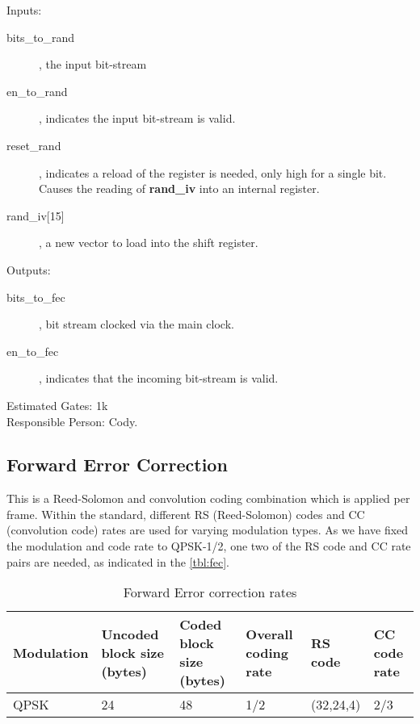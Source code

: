 \documentclass[dvips,10pt,twocolumn]{article}
\begin{document}
	\begin{description}
		\item{Inputs:}
		\begin{description}
			\item[bits\_to\_rand], the input bit-stream
			\item[en\_to\_rand], indicates the input bit-stream
				is valid.
			\item[reset\_rand], indicates a reload of the
				register is needed, only high for a single
				bit. Causes the reading of \textbf{rand\_iv}
				into an internal register.
			\item[rand\_iv{[15]}], a new vector to load into
				the shift register.
		\end{description}
		\item{Outputs:}
		\begin{description}
			\item[bits\_to\_fec], bit stream clocked via the
				main clock.
			\item[en\_to\_fec], indicates that the incoming
				bit-stream is valid.
		\end{description}
	\end{description}

	Estimated Gates: 1k \\
	Responsible Person: Cody.

	\subsection{Forward Error Correction}
	\label{sec:fec}
	This is a Reed-Solomon and convolution coding combination
	which is applied per frame. Within the standard, different
	RS (Reed-Solomon) codes and CC (convolution code) rates are
	used for varying modulation types. As we have fixed the
	modulation and code rate to QPSK-1/2, one two of the RS
	code and CC rate pairs are needed, as indicated in the
	\autoref{tbl:fec}.
	
	\begin{table*}
		\begin{tabular}{p{2cm}|p{2cm}|p{2cm}|p{2cm}|p{2cm}|p{2cm}}
		\label{tbl:fec}
			Modulation & Uncoded block size (bytes) &
			Coded block size (bytes) & Overall coding
			rate & RS code & CC code rate \\ \hline
			QPSK & 24 & 48 & 1/2 & (32,24,4) & 2/3 \\
		\end{tabular}
		\caption{Forward Error correction rates}
	\end{table*}
\end{document}
